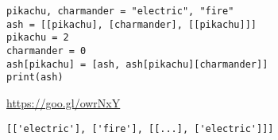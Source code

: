 \begin{blocksection}
\question
\begin{lstlisting}
pikachu, charmander = "electric", "fire"
ash = [[pikachu], [charmander], [[pikachu]]]
pikachu = 2
charmander = 0
ash[pikachu] = [ash, ash[pikachu][charmander]]
print(ash)
\end{lstlisting}

\begin{solution}[1in]
\url{https://goo.gl/owrNxY}

\verb+[['electric'], ['fire'], [[...], ['electric']]]+
\end{solution}
\end{blocksection}
